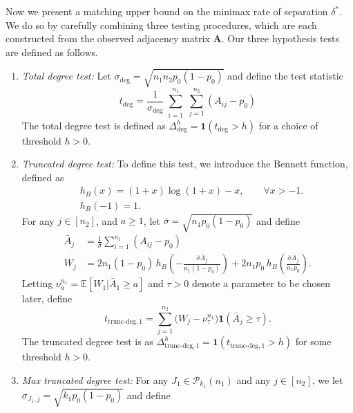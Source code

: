 \documentclass{article}
\newcommand{\A}{\mathbf{A}}
\newcommand{\one}{\mathbf{1}}
\newcommand{\lin}{\text{deg}}
\newcommand{\maxlin}{\text{max-deg}}
\newcommand{\chisqlin}{\text{trunc-deg}}
\begin{document}
Now we present a matching upper bound on the minimax rate of separation $\delta^*$. We do so by carefully combining three testing procedures, which are each constructed from the observed adjacency matrix $\A$. 
Our three hypothesis tests are defined as follows.
\begin{enumerate}
    \item \textit{Total degree test:} Let $\sigma_{\lin} = \sqrt{n_1n_2p_0(1-p_0)}$ and define the test statistic
\begin{equation}\label{eq_def_linear}
        t_{\lin} = \frac{1}{\sigma_{\lin}}\sum_{\substack{i = 1}}^{n_1}\sum_{j = 1}^{n_2}(A_{ij} - p_0)
    \end{equation}
    The total degree test is defined as $\Delta_\lin^h = \one(t_\lin > h)$ for a choice of threshold $h > 0$.
    \item \textit{Truncated degree test:}
    To define this test, we introduce the Bennett function, defined as
\begin{align}
    &h_B(x) = (1+x) \log(1+x) - x,\qquad \forall x>-1.\label{eq_def_h_bennett}\\
    &h_B(-1) = 1.
\end{align}
For any $j \in [n_2]$, and $a \geq 1$, let $\bar \sigma = \sqrt{n_1p_0(1-p_0)}$ and define  
    \begin{align}
        \bar{A}_j &= \frac{1}{\bar \sigma}\sum_{i = 1}^{n_1}(A_{ij}-p_0)\nonumber\\
        W_j &= 2n_1(1-p_0) \,h_B\!\left(-\frac{\bar \sigma \bar A_j}{n_1(1-p_0)}\right) + 2n_1 p_0 \,h_B\!\left(\frac{\bar \sigma \bar A_j}{n_1p_0}\right).\label{eq_def_trunc_deg}
    \end{align}
    Letting $\nu_a^{n_1} =  \mathbb 
    E\left[W_1| \bar A_1 \geq a\right]$ and $\tau > 0$ denote a parameter to be chosen later, define\begin{equation}\label{eq_def_linchisq}
        t_{\chisqlin, 1} = \sum_{j = 1}^{n_2}\big(W_j - \nu_\tau^{n_1}\big)\one(\bar{A}_j \geq \tau).
    \end{equation}
    The truncated degree test is as $\Delta_{\chisqlin, 1}^h = \one(t_{\chisqlin, 1} > h)$ for some threshold $h > 0$. 
    \item \textit{Max truncated degree test:}  
    For any $J_1 \in \mathcal{P}_{k_1}(n_1)$ and any $j \in [n_2]$, we let $\sigma_{J_1,j} = \sqrt{k_1 p_0 (1 - p_0)}$ and define

\end{enumerate}
\end{document}
